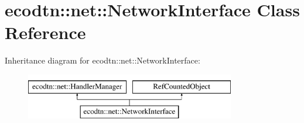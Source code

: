 \hypertarget{classecodtn_1_1net_1_1NetworkInterface}{}\section{ecodtn\+:\+:net\+:\+:Network\+Interface Class Reference}
\label{classecodtn_1_1net_1_1NetworkInterface}
Inheritance diagram for ecodtn\+:\+:net\+:\+:Network\+Interface\+:\begin{figure}[H]
\begin{center}
\leavevmode
\includegraphics[height=2.000000cm]{classecodtn_1_1net_1_1NetworkInterface}
\end{center}
\end{figure}
